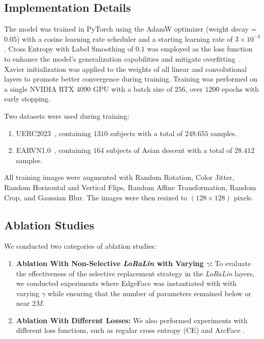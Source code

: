 \documentclass[a4paper, 10pt, conference]{ieeeconf}
\begin{document}
\subsection{Implementation Details}

The model was trained in PyTorch using the AdamW optimizer (weight decay = $0.05$) with a cosine learning rate scheduler and a starting learning rate of \(3 \times 10^{-3}\). Cross Entropy with Label Smoothing of $0.1$ was employed as the loss function to enhance the model's generalization capabilities and mitigate overfitting~\cite{szegedy2016rethinking}. Xavier initialization was applied to the weights of all linear and convolutional layers to promote better convergence during training. Training was performed on a single NVIDIA RTX 4090 GPU with a batch size of $256$, over $1200$ epochs with early stopping.


Two datasets were used during training: 
\begin{enumerate}
    \item UERC2023~\cite{uerc2023}, containing $1310$ subjects with a total of $248.655$ samples.
    \item EARVN1.0~\cite{hoang2019earvn1}, containing $164$ subjects of Asian descent with a total of $28.412$ samples.
\end{enumerate}

All training images were augmented with Random Rotation, Color Jitter, Random Horizontal and Vertical Flips, Random Affine Transformation, Random Crop, and Gaussian Blur. The images were then resized to $(128 \times 128)$ pixels.

\subsection{Ablation Studies}
We conducted two categories of ablation studies:

\begin{enumerate}
    \item \textbf{Ablation With Non-Selective \textit{LoRaLin} with Varying \(\gamma\):} 
    To evaluate the effectiveness of the selective replacement strategy in the \textit{LoRaLin} layers, we conducted experiments where EdgeFace was instantiated with with varying \(\gamma\) while ensuring that the number of parameters remained below or near $2M$.
    \item \textbf{Ablation With Different Losses:} 
    We also performed experiments with different loss functions, such as regular cross entropy (CE) and ArcFace \cite{deng2019arcface}.
\end{enumerate}
\end{document}
